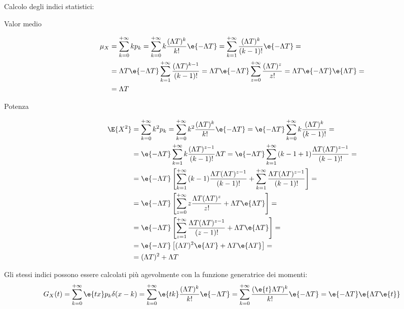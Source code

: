 \begin{flushleft}
Calcolo degli indici statistici:
\end{flushleft}
\begin{description}
\item[Valor medio]
\begin{equation}
\begin{split}
	\mu_X&=\sum_{k=0}^{+\infty}{k p_k}=\sum_{k=0}^{+\infty}{k \frac{(\Lambda T)^k}{k!}\e{-\Lambda T}}=\sum_{k=1}^{+\infty}{\frac{(\Lambda T)^k}{(k-1)!}\e{-\Lambda T}}=\\
	&=\Lambda T \e{-\Lambda T} \sum_{k=1}^{+\infty}{\frac{(\Lambda T)^{k-1}}{(k-1)!}}=\Lambda T \e{-\Lambda T}\sum_{z=0}^{+\infty}{\frac{(\Lambda T)^z}{z!}}=\Lambda T \e{-\Lambda T}\e{\Lambda T}=\\
	&=\Lambda T
\end{split}
\end{equation}
\item[Potenza]
\begin{equation}
\begin{split}
	\E{X^2}&=\sum_{k=0}^{+\infty}{k^2 p_k}=\sum_{k=0}^{+\infty}{k^2 \frac{(\Lambda T)^k}{k!}\e{-\Lambda T}}=\e{-\Lambda T}\sum_{k=0}^{+\infty}{k\frac{(\Lambda T)^k}{(k-1)!}}=\\
	&=\e{-\Lambda T}\sum_{k=1}^{+\infty}{k\frac{(\Lambda T)^{z-1}}{(k-1)!}\Lambda T}=
	\e{-\Lambda T}\sum_{k=1}^{+\infty}{(k-1+1)\frac{\Lambda T(\Lambda T)^{z-1}}{(k-1)!}}=\\
	&=\e{-\Lambda T}\left[\sum_{k=1}^{+\infty}{(k-1)\frac{\Lambda T(\Lambda T)^{z-1}}{(k-1)!}} + \sum_{k=1}^{+\infty}{\frac{\Lambda T(\Lambda T)^{z-1}}{(k-1)!}}\right]=\\
	&=\e{-\Lambda T}\left[\sum_{z=0}^{+\infty}{z\frac{\Lambda T(\Lambda T)^z}{z!}} + \Lambda T\e{\Lambda T}\right]=\\
	&=\e{-\Lambda T}\left[\sum_{z=1}^{+\infty}{\frac{\Lambda T(\Lambda T)^{z-1}}{(z-1)!}} + \Lambda T\e{\Lambda T}\right]=\\
	&=\e{-\Lambda T}\left[(\Lambda T)^2 \e{\Lambda T} + \Lambda T\e{\Lambda T}\right]=\\
	&=(\Lambda T)^2 + \Lambda T
\end{split}
\end{equation}
\end{description}

Gli stessi indici possono essere calcolati più agevolmente con la funzione generatrice dei momenti:
\begin{equation}
	G_X(t)=\sum_{k=0}^{+\infty}{\e{t x}p_k\delta(x-k)}=\sum_{k=0}^{+\infty}{\e{t k}\frac{(\Lambda T)^k}{k!}\e{-\Lambda T}}=\sum_{k=0}^{+\infty}{\frac{(\e{t}\Lambda T)^k}{k!}\e{-\Lambda T}}=\e{-\Lambda T}\e{\Lambda T\e{t}}
\end{equation}

